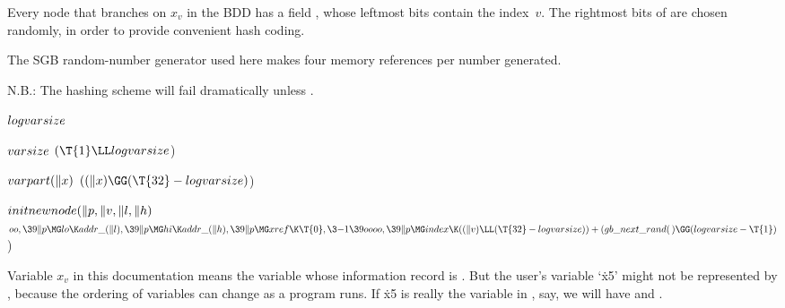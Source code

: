 Every node  that branches on $x_v$ in the BDD has a field ,
whose leftmost  bits contain the index~$v$. The rightmost
 bits of  are chosen
randomly, in order to
provide convenient hash coding.

The SGB random-number generator used here makes four memory references
per number generated.

N.B.: The hashing scheme will fail dramatically unless
.

\Y\B\4\D$\\{logvarsize}$ \5
\par
\B\4\D$\\{varsize}$ \5
$(\T{1}\LL\\{logvarsize}{}$)\par
\B\4\D$\\{varpart}(\|x)$ \5
$((\|x)\GG(\T{32}-\\{logvarsize}){}$)\par
\B\4\D$\\{initnewnode}(\|p,\|v,\|l,\|h)$ \5
$\\{oo},\39\|p\MG\\{lo}\K\\{addr\_}(\|l),\39\|p\MG\\{hi}\K\\{addr\_}(\|h),\39%
\|p\MG\\{xref}\K\T{0},\3{-1}\39\\{oooo},\39\|p\MG\\{index}\K((\|v)\LL(\T{32}-%
\\{logvarsize}))+(\\{gb\_next\_rand}(\,)\GG(\\{logvarsize}-\T{1}){}$)\par
\fi

Variable $x_v$ in this documentation means the variable whose information
record is . But the user's variable `\.{x5}' might not be
represented by , because the ordering of variables can
change
as a program runs. If \.{x5} is really the variable in , say, we
will have  and .

